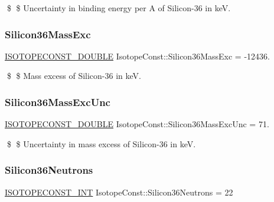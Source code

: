 \$ \$ Uncertainty in binding energy per A of Silicon-\/36 in keV. \mbox{\label{group___isotope_const-_silicon-_si36_gad75a0e695574362bae2eb355b5068f1a}} 
\subsubsection{\texorpdfstring{Silicon36\+Mass\+Exc}{Silicon36MassExc}}
{\footnotesize\ttfamily \mbox{\hyperlink{group___isotope_const-_macros_ga8f45a7272ce02c0b4c65c44636ed719a}{I\+S\+O\+T\+O\+P\+E\+C\+O\+N\+S\+T\+\_\+\+D\+O\+U\+B\+LE}} Isotope\+Const\+::\+Silicon36\+Mass\+Exc = -\/12436.}

\$ \$ Mass excess of Silicon-\/36 in keV. \mbox{\label{group___isotope_const-_silicon-_si36_gaeded9e90c36e22c1ff21c4a60e5873ea}} 
\subsubsection{\texorpdfstring{Silicon36\+Mass\+Exc\+Unc}{Silicon36MassExcUnc}}
{\footnotesize\ttfamily \mbox{\hyperlink{group___isotope_const-_macros_ga8f45a7272ce02c0b4c65c44636ed719a}{I\+S\+O\+T\+O\+P\+E\+C\+O\+N\+S\+T\+\_\+\+D\+O\+U\+B\+LE}} Isotope\+Const\+::\+Silicon36\+Mass\+Exc\+Unc = 71.}

\$ \$ Uncertainty in mass excess of Silicon-\/36 in keV. \mbox{\label{group___isotope_const-_silicon-_si36_ga6e6efa8d05b2fe6cef6e8f4e073b55b7}} 
\subsubsection{\texorpdfstring{Silicon36\+Neutrons}{Silicon36Neutrons}}
{\footnotesize\ttfamily \mbox{\hyperlink{group___isotope_const-_macros_ga5f18360b3e99483a35c32d789e62621c}{I\+S\+O\+T\+O\+P\+E\+C\+O\+N\+S\+T\+\_\+\+I\+NT}} Isotope\+Const\+::\+Silicon36\+Neutrons = 22}

